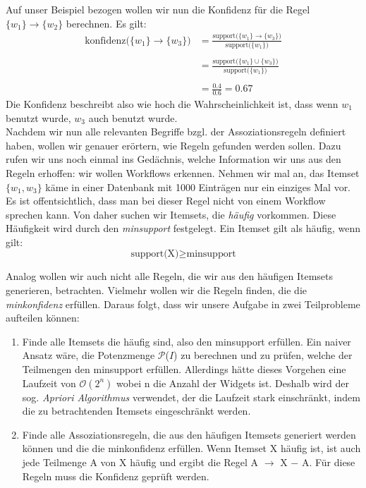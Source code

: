 Auf unser Beispiel bezogen wollen wir nun die Konfidenz für die Regel $\{w_1\} \rightarrow \{w_2\}$ berechnen. Es gilt:\\
\begin{align*}
	\text{konfidenz($\{w_1\} \rightarrow \{w_3\}$)} &= \frac{\text{support($\{w_1\} \rightarrow \{w_3\}$)}}{\text{support($\{w_1\}$)}}\\ \\
	&= \frac{\text{support($\{w_1\} \cup \{w_3\}$)}}{\text{support($\{w_1\}$)}}\\ \\
	&= \frac{0.4}{0.6} = 0.67
\end{align*}
Die Konfidenz beschreibt also wie hoch die Wahrscheinlichkeit ist, dass wenn $w_1$ benutzt wurde, $w_3$ auch benutzt wurde. \citep{BeKe19}\\

Nachdem wir nun alle relevanten Begriffe bzgl. der Assoziationsregeln definiert haben, wollen wir genauer erörtern, wie Regeln gefunden werden sollen. Dazu rufen wir uns noch einmal ins Gedächnis, welche Information wir uns aus den Regeln erhoffen: wir wollen Workflows erkennen. Nehmen wir mal an, das Itemset $\{w_1,w_3\}$ käme in einer Datenbank mit 1000 Einträgen nur ein einziges Mal vor. Es ist offentsichtlich, dass man bei dieser Regel nicht von einem Workflow sprechen kann. Von daher suchen wir Itemsets, die \textit{häufig} vorkommen. Diese Häufigkeit wird durch den \textit{minsupport} festgelegt. Ein Itemset gilt als häufig, wenn gilt:\\
\begin{equation*}
	\text{support(X)} \geq \text{minsupport}
\end{equation*}

Analog wollen wir auch nicht alle Regeln, die wir aus den häufigen Itemsets generieren, betrachten. Vielmehr wollen wir die Regeln finden, die die \textit{minkonfidenz} erfüllen. Daraus folgt, dass wir unsere Aufgabe in zwei Teilprobleme aufteilen können:
\begin{enumerate}
	\item Finde alle Itemsets die häufig sind, also den minsupport erfüllen. Ein naiver Ansatz wäre, die Potenzmenge $\mathcal{P}$($I$) zu berechnen und zu prüfen, welche der Teilmengen den minsupport erfüllen. Allerdings hätte dieses Vorgehen eine Laufzeit von $\mathcal{O}(2^n)$ wobei n die Anzahl der Widgets ist. Deshalb wird der sog. \textit{Apriori Algorithmus} verwendet, der die Laufzeit stark einschränkt, indem die zu betrachtenden Itemsets eingeschränkt werden.\\
	\item Finde alle Assoziationsregeln, die aus den häufigen Itemsets generiert werden können und die die minkonfidenz erfüllen. Wenn Itemset X häufig ist, ist auch jede Teilmenge A von X häufig und ergibt die Regel A $\rightarrow$ X $-$ A. Für diese Regeln muss die Konfidenz geprüft werden.
\end{enumerate}

